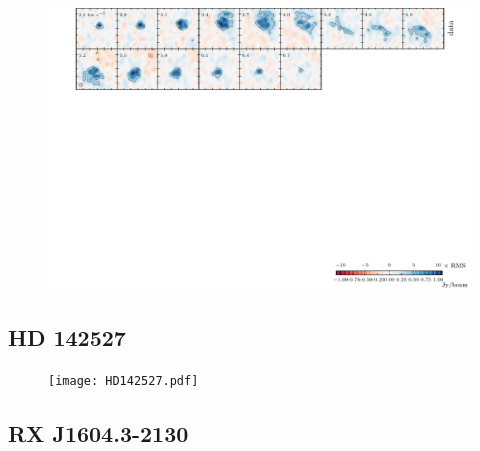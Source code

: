 \documentclass[twocolumn]{aastex6}
\begin{document}
\begin{figure}[htb]
\begin{center}
  \includegraphics{IMLup.pdf}
  \end{center}
\end{figure}

\subsection{HD 142527}

\begin{figure}[htb]
\begin{center}
  \texttt{[image: HD142527.pdf]}
  \end{center}
\end{figure}

\subsection{RX J1604.3-2130}
\end{document}
